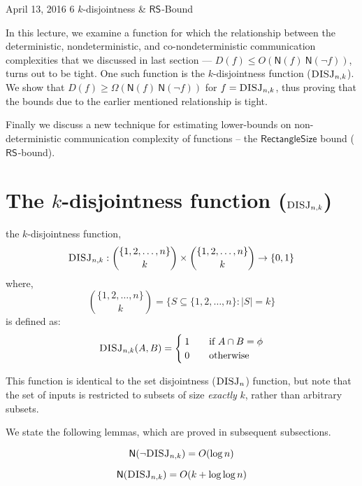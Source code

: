 \documentclass[usletter]{article}
\newcommand {\complexity}[1] {\ensuremath{\mathsf{#1}}}
\newcommand {\N}             {\complexity{N}}
\newcommand {\RS}[1]         {\ensuremath{\complexity{RS}_{#1}}}
\newcommand {\function}[2]  {\ensuremath{\textsc{#1}_{#2}}}
\newcommand {\DISJ}[2]      {\function{DISJ}{#1,#2}}
\newcommand {\bigO}     {\ensuremath{O}}
\newcommand {\bigW}     {\ensuremath{\Omega}}
\newcommand {\bit}       {\ensuremath{\{0,1\}}}
\newcommand {\range}[2]  {\ensuremath{\{#1{1},#1{2},\ldots,#1{#2}\}}}
\begin{document}
           {April 13, 2016}                           %
           {6}                                        %
           {$k$-disjointness \& \RS{}-Bound}  %

\noindent
In this lecture, we examine a function for which the relationship between the deterministic, nondeterministic, and co-nondeterministic communication complexities that we discussed in last section --- $D(f) \leqslant \bigO(\N(f)\ \N(\neg f))$, turns out to be tight. One such function is the $k$-disjointness function (\DISJ{n}{k}). We show that $D(f) \geqslant \bigW(\N(f)\ \N(\neg f))$ for $f = \DISJ{n}{k}$, thus proving that the bounds due to the earlier mentioned relationship is tight.

Finally we discuss a new technique for estimating lower-bounds on non-deterministic communication complexity of functions -- the \complexity{RectangleSize} bound (\RS{}-bound).

\section{The $k$-disjointness function (\textnormal{\DISJ{n}{k})}}

\begin{definition}
the $k$-disjointness function,
$$
\DISJ{n}{k} : \binom{\range{}{n}}{k} \times \binom{\range{}{n}}{k} \rightarrow \bit
$$
where,
$$
\binom{\range{}{n}}{k} = \{ S \subseteq \range{}{n} : |S| = k\}
$$
is defined as:
$$
\DISJ{n}{k}(A, B) =
  \begin{cases}
    \: 1 & \quad \text{if } A \cap B = \phi \\
    \: 0 & \quad \text{otherwise}\\
  \end{cases}
$$
\end{definition}

\noindent
This function is identical to the set disjointness (\function{DISJ}{n}) function, but note that the set of inputs is restricted to subsets of size \textit{exactly} $k$, rather than arbitrary subsets.

\noindent
We state the following lemmas, which are proved in subsequent subsections.
\begin{lemma}
\label{co-nondet-disj_nk}
$$
\N(\neg\DISJ{n}{k}) = \bigO(\log{n})
$$
\end{lemma}

\begin{lemma}
\label{nondet-disj_nk}
$$
\N(\DISJ{n}{k}) = \bigO(k + \log{\log{n}})
$$
\end{lemma}
\end{document}
